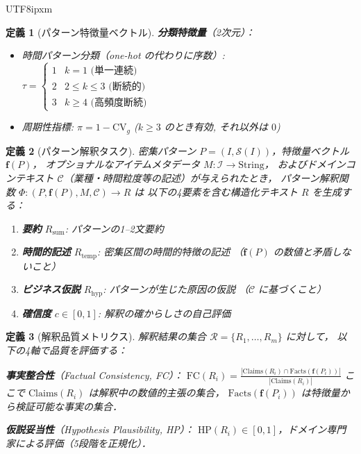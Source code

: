 \documentclass[conference]{IEEEtran}
\newtheorem{definition}{定義}
\begin{document}
\begin{CJK}{UTF8}{ipxm}
\begin{definition}[パターン特徴量ベクトル]
\noindent\textbf{分類特徴量}（2次元）：
\begin{itemize}[leftmargin=*,nosep]
    \item 時間パターン分類（one-hot の代わりに序数）:
        $\tau = \begin{cases}
            1 & k = 1 \text{ (単一連続)} \\
            2 & 2 \leq k \leq 3 \text{ (断続的)} \\
            3 & k \geq 4 \text{ (高頻度断続)}
        \end{cases}$
    \item 周期性指標: $\pi = 1 - \text{CV}_g$ ($k \geq 3$ のとき有効, それ以外は $0$)
\end{itemize}
\end{definition}

\begin{definition}[パターン解釈タスク]
\label{def:interpretation}
密集パターン $P = (I, \mathcal{S}(I))$，特徴量ベクトル $\mathbf{f}(P)$，
オプショナルなアイテムメタデータ $M: \mathcal{I} \to \text{String}$，
およびドメインコンテキスト $\mathcal{C}$（業種・時間粒度等の記述）が与えられたとき，
パターン解釈関数 $\Phi: (P, \mathbf{f}(P), M, \mathcal{C}) \to R$ は
以下の4要素を含む構造化テキスト $R$ を生成する：
\begin{enumerate}[nosep]
    \item \textbf{要約} $R_{\text{sum}}$: パターンの1--2文要約
    \item \textbf{時間的記述} $R_{\text{temp}}$: 密集区間の時間的特徴の記述
    （$\mathbf{f}(P)$ の数値と矛盾しないこと）
    \item \textbf{ビジネス仮説} $R_{\text{hyp}}$: パターンが生じた原因の仮説
    （$\mathcal{C}$ に基づくこと）
    \item \textbf{確信度} $c \in [0, 1]$: 解釈の確からしさの自己評価
\end{enumerate}
\end{definition}

\begin{definition}[解釈品質メトリクス]
\label{def:metrics}
解釈結果の集合 $\mathcal{R} = \{R_1, \ldots, R_m\}$ に対して，
以下の4軸で品質を評価する：

\noindent\textbf{事実整合性}（Factual Consistency, FC）：
$\text{FC}(R_i) = \frac{|\text{Claims}(R_i) \cap \text{Facts}(\mathbf{f}(P_i))|}{|\text{Claims}(R_i)|}$
ここで $\text{Claims}(R_i)$ は解釈中の数値的主張の集合，
$\text{Facts}(\mathbf{f}(P_i))$ は特徴量から検証可能な事実の集合．

\noindent\textbf{仮説妥当性}（Hypothesis Plausibility, HP）：
$\text{HP}(R_i) \in [0, 1]$，ドメイン専門家による評価（5段階を正規化）．


\end{definition}
\end{CJK}
\end{document}
